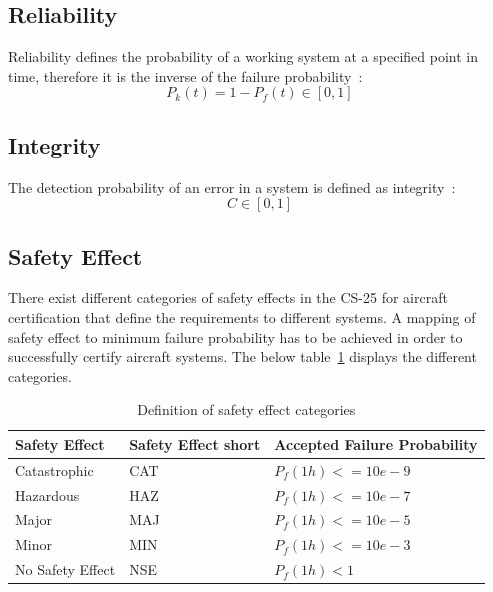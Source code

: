 \subsection{Reliability}\label{subsec:reliability}
Reliability defines the probability of a working system at a specified point in time,
therefore it is the inverse of the failure probability~\cite{lfs2}:
\begin{equation}
    \label{eq:reliability}
    P_k(t) = 1 - P_f(t) \in [0,1]
\end{equation}
\subsection{Integrity}\label{subsec:integrity}
The detection probability of an error in a system is defined as integrity~\cite{lfs2}:
\begin{equation}
    \label{eq:integrity}
    C \in [0,1]
\end{equation}
\subsection{Safety Effect}\label{subsec:safety-effect}
There exist different categories of safety effects in the CS-25 for aircraft certification that define the requirements to different systems.
A mapping of safety effect to minimum failure probability has to be achieved in order to successfully certify aircraft systems.
The below table~\ref{tab:safety-effect} displays the different categories.

\begin{table}[!htb]
    \centering
    \begin{tabular}{l|l|l}
        Safety Effect    & Safety Effect short & Accepted Failure Probability \\ \hline
        Catastrophic     & CAT                 & $P_f(1h) <= 10e-9$           \\
        Hazardous        & HAZ                 & $P_f(1h) <= 10e-7$           \\
        Major            & MAJ                 & $P_f(1h) <= 10e-5$           \\
        Minor            & MIN                 & $P_f(1h) <= 10e-3$           \\
        No Safety Effect & NSE                 & $P_f(1h) < 1$
    \end{tabular}
    \caption{Definition of safety effect categories}
    \label{tab:safety-effect}
\end{table}
